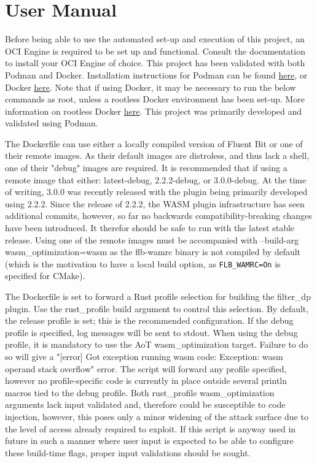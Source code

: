 \chapter{User Manual\label{chap:user_man}}

Before being able to use the automated set-up and execution of this project, an OCI Engine is required to be set up and functional. Consult the documentation to install your OCI Engine of choice. This project has been validated with both Podman and Docker. Installation instructions for Podman can be found \href{https://podman.io/docs/installation}{here},  or Docker \href{https://docs.docker.com/get-docker/}{here}. Note that if using Docker, it may be necessary to run the below commands as root, unless a rootless Docker environment has been set-up. More information on rootless Docker \href{https://docs.docker.com/engine/security/rootless/}{here}. This project was primarily developed and validated using Podman.

The Dockerfile can use either a locally compiled version of Fluent Bit or one of their remote images. As their default images are distroless, and thus lack a shell, one of their "debug" images are required. It is recommended that if using a remote image that either: latest-debug, 2.2.2-debug, or 3.0.0-debug. At the time of writing, 3.0.0 was recently released with the plugin being primarily developed using 2.2.2. Since the release of 2.2.2, the WASM plugin infrastructure has seen additional commits, however, so far no backwards compatibility-breaking changes have been introduced. It therefor should be safe to run with the latest stable release. Using one of the remote images must be accompanied with --build-arg wasm\_optimization=wasm as the flb-wamrc binary is not compiled by default (which is the motivation to have a local build option, as \texttt{FLB_WAMRC=On} is specified for CMake). 

The Dockerfile is set to forward a Rust profile selection for building the filter\_dp plugin. Use the rust\_profile build argument to control this selection. By default, the release profile is set; this is the recommended configuration. If the debug profile is specified, log messages will be sent to stdout. When using the debug profile, it is mandatory to use the AoT wasm\_optimization target. Failure to do so will give a "[error] Got exception running wasm code: Exception: wasm operand stack overflow" error. The script will forward any profile specified, however no profile-specific code is currently in place outside several println macros tied to the debug profile. Both rust\_profile wasm\_optimization arguments lack input validated and, therefore could be susceptible to code injection, however, this poses only a minor widening of the attack surface due to the level of access already required to exploit. If this script is anyway used in future in such a manner where user input is expected to be able to configure these build-time flags, proper input validations should be sought. 

